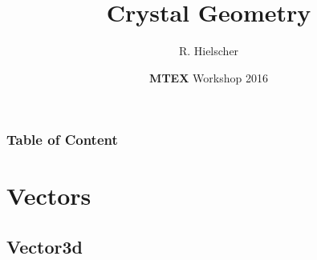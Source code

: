 \documentclass[compress]{beamer}
\author{R. Hielscher}
\title{Crystal Geometry}
\institute{Faculty of Mathematics,\\
	Chemnitz University of Technology, Germany}
\date{{\bf{\color{red}M}TEX} Workshop 2016}
\begin{document}
\begin{frame}
  \maketitle{}
\end{frame}

\begin{frame}
  \frametitle{Table of Content}

\tableofcontents{}

\end{frame}


\section{Vectors}

\subsection*{Vector3d}
\end{document}
